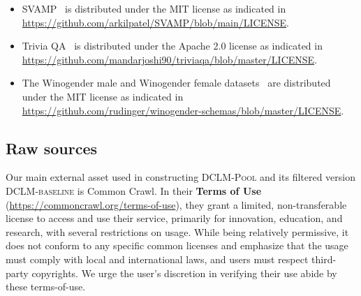 \documentclass{article}
\newcommand{\rawpool}{\textsc{DCLM-Pool}\xspace}
\newcommand{\hqpool}{\textsc{DCLM-baseline}\xspace}
\newcommand{\commoncrawl}{Common Crawl\xspace}
\begin{document}
\begin{itemize}
    \item
    SVAMP~\citep{patel2021nlp}  is distributed under the MIT license as indicated in \url{https://github.com/arkilpatel/SVAMP/blob/main/LICENSE}.
    \item
    Trivia QA~\citep{triviaqa} is distributed under the Apache 2.0 license as indicated in \url{https://github.com/mandarjoshi90/triviaqa/blob/master/LICENSE}.
    \item
    The Winogender male and Winogender female datasets~\citep{winogender} are distributed under the MIT license as indicated in \url{https://github.com/rudinger/winogender-schemas/blob/master/LICENSE}.
\end{itemize}

\subsection{Raw sources}
Our main external asset used in constructing \rawpool and its filtered version \hqpool is \commoncrawl \citep{commoncrawl}. In their \textbf{Terms of Use} (\url{https://commoncrawl.org/terms-of-use}), they grant a limited, non-transferable license to access and use their service, primarily for innovation, education, and research, with several restrictions on usage. While being relatively permissive, it does not conform to any specific common licenses and emphasize that the usage must comply with local and international laws, and users must respect third-party copyrights. We urge the user's discretion in verifying their use abide by these terms-of-use.
\end{document}

